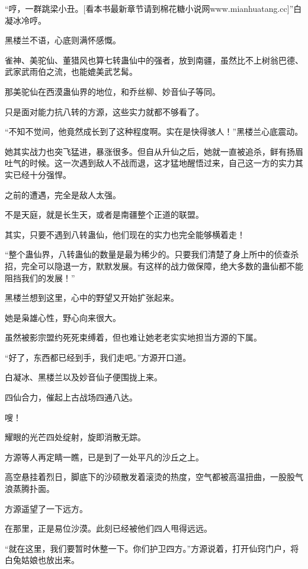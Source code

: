 
\begin{this_body}

“哼，一群跳梁小丑。[看本书最新章节请到棉花糖小说网www.mianhuatang.cc]”白凝冰冷哼。

黑楼兰不语，心底则满怀感慨。

雀神、美驼仙、董猎风也算七转蛊仙中的强者，放到南疆，虽然比不上树翁巴德、武家武雨伯之流，也能媲美武艺髯。

那美驼仙在西漠蛊仙界的地位，和乔丝柳、妙音仙子等同。

只是面对能力抗八转的方源，这些实力就都不够看了。

“不知不觉间，他竟然成长到了这种程度啊。实在是快得骇人！”黑楼兰心底震动。

她其实战力也突飞猛进，暴涨很多。但自从升仙之后，她就一直被追杀，鲜有扬眉吐气的时候。这一次遇到敌人不战而退，这才猛地醒悟过来，自己这一方的实力其实已经十分强悍。

之前的遭遇，完全是敌人太强。

不是天庭，就是长生天，或者是南疆整个正道的联盟。

其实，只要不遇到八转蛊仙，他们现在的实力也完全能够横着走！

“整个蛊仙界，八转蛊仙的数量是最为稀少的。只要我们清楚了身上所中的侦查杀招，完全可以隐退一方，默默发展。有这样的战力做保障，绝大多数的蛊仙都不能阻挡我们的发展！”

黑楼兰想到这里，心中的野望又开始扩张起来。

她是枭雄心性，野心向来很大。

虽然被影宗盟约死死束缚着，但也难让她老老实实地担当方源的下属。

“好了，东西都已经到手，我们走吧。”方源开口道。

白凝冰、黑楼兰以及妙音仙子便围拢上来。

四仙合力，催起上古战场四通八达。

嗖！

耀眼的光芒四处绽射，旋即消散无踪。

方源等人再定睛一瞧，已是到了一处平凡的沙丘之上。

高空悬挂着烈日，脚底下的沙硕散发着滚烫的热度，空气都被高温扭曲，一股股气浪蒸腾扑面。

方源遥望了一下远方。

在那里，正是易位沙漠。此刻已经被他们四人甩得远远。

“就在这里，我们要暂时休整一下。你们护卫四方。”方源说着，打开仙窍门户，将白兔姑娘也放出来。


\end{this_body}
